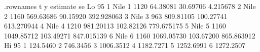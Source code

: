 \begin{Schunk}
\begin{Soutput}
  .rownames t    y   estimate        se      Lo 95
1      Nile 1 1120   64.38081  30.69706   4.215678
2      Nile 2 1160  569.63686  90.15920 392.928063
3      Nile 3  963  809.81105 100.27741 613.270944
4      Nile 4 1210  981.20113 102.82126 779.675175
5      Nile 5 1160 1049.85712 103.49271 847.015139
6      Nile 6 1160 1069.05730 103.67200 865.863912
      Hi 95
1  124.5460
2  746.3456
3 1006.3512
4 1182.7271
5 1252.6991
6 1272.2507
\end{Soutput}
\end{Schunk}
